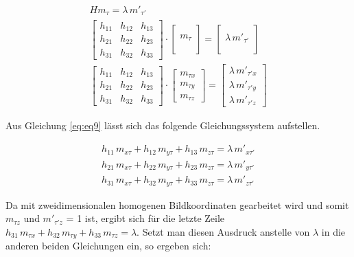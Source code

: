 \begin{gather}
	 H m_\tau = \lambda \,m'_{\tau'}\\
	\begin{bmatrix}
		h_{11}&h_{12}&h_{13}\\
		h_{21}&h_{22}&h_{23}\\
		h_{31}&h_{32}&h_{33}
	\end{bmatrix}
	\cdot
	\begin{bmatrix}
		\\m_\tau\\\\
	\end{bmatrix}
	=
	\begin{bmatrix}
		\\\lambda\, m'_{\tau'}\\\\
	\end{bmatrix}\\
	\begin{bmatrix}
		h_{11}&h_{12}&h_{13}\\
		h_{21}&h_{22}&h_{23}\\
		h_{31}&h_{32}&h_{33}
	\end{bmatrix}
	\cdot
	\begin{bmatrix}
		m_{\tau x}\\m_{\tau y}\\m_{\tau z}
	\end{bmatrix}
	=
	\begin{bmatrix}
		\lambda\, m'_{\tau' x}\\\lambda\, m'_{\tau' y}\\\lambda \,m'_{\tau' z}\label{eq:eq9}
	\end{bmatrix}
\end{gather}

Aus Gleichung \ref{eq:eq9} lässt sich das folgende Gleichungssystem aufstellen.  

\begin{gather}
	h_{11}\,m_{x \tau}+h_{12}\,m_{y \tau}+h_{13}\,m_{z \tau}= \lambda \,m'_{x\tau'}\\
	h_{21}\,m_{x\tau}+h_{22}\,m_{y\tau}+h_{23}\,m_{z\tau}= \lambda\, m'_{y\tau'}\\
	h_{31}\,m_{x\tau}+h_{32}\,m_{y\tau}+h_{33}\,m_{z\tau}= \lambda \,m'_{z\tau'}
\end{gather}

Da mit zweidimensionalen homogenen Bildkoordinaten gearbeitet wird und somit $m_{\tau z}$ und $m'_{\tau' z}$ = 1 ist, ergibt sich für die letzte Zeile $h_{31}\,m_{\tau x}+h_{32}\,m_{\tau y}+h_{33}\,m_{\tau z}= \lambda$. Setzt man diesen Ausdruck anstelle von $\lambda$ in die anderen beiden Gleichungen ein, so ergeben sich:

